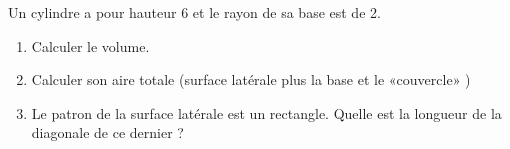 
\begin{exercice}\label{exosmath-0009}

    Un cylindre a pour hauteur \unit{6}{\centi\meter} et le rayon de sa base est de \unit{2}{\centi\meter}.
    \begin{enumerate}
        \item
            Calculer le volume.
        \item
            Calculer son aire totale (surface latérale plus la base et le «couvercle» )
        \item
            Le patron de la surface latérale est un rectangle. Quelle est la longueur de la diagonale de ce dernier ?
    \end{enumerate}

\end{exercice}
